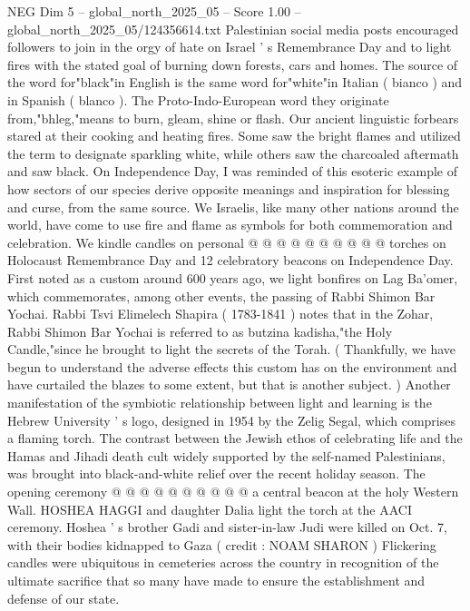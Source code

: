 \begin{textsample}{NEG Dim 5 – global\_north\_2025\_05 – Score 1.00 – global\_north\_2025\_05/124356614.txt}  \label{ex:f5_neg_378}
Palestinian social media posts encouraged followers to join in the orgy of hate on Israel ' s Remembrance Day and to light fires with the stated goal of burning down forests, cars and homes.
The source of the word for"black"in English is the same word for"white"in Italian ( bianco ) and in Spanish ( blanco ).
The Proto-Indo-European word they originate from,"bhleg,"means to burn, gleam, shine or flash.
Our ancient linguistic forbears stared at their cooking and heating fires.
Some saw the bright flames and utilized the term to designate sparkling white, while others saw the charcoaled aftermath and saw black.
On Independence Day, I was reminded of this esoteric example of how sectors of our species derive opposite meanings and inspiration for blessing and curse, from the same source.
We Israelis, like many other nations around the world, have come to use fire and flame as symbols for both commemoration and celebration.
We kindle candles on personal @ @ @ @ @ @ @ @ @ @ torches on Holocaust Remembrance Day and 12 celebratory beacons on Independence Day.
First noted as a custom around 600 years ago, we light bonfires on Lag Ba'omer, which commemorates, among other events, the passing of Rabbi Shimon Bar Yochai.
Rabbi Tsvi Elimelech Shapira ( 1783-1841 ) notes that in the Zohar, Rabbi Shimon Bar Yochai is referred to as butzina kadisha,"the Holy Candle,"since he brought to light the secrets of the Torah. ( Thankfully, we have begun to understand the adverse effects this custom has on the environment and have curtailed the blazes to some extent, but that is another subject. ) Another manifestation of the symbiotic relationship between light and learning is the Hebrew University ' s logo, designed in 1954 by the Zelig Segal, which comprises a flaming torch.
The contrast between the Jewish ethos of celebrating life and the Hamas and Jihadi death cult widely supported by the self-named Palestinians, was brought into black-and-white relief over the recent holiday season.
The opening ceremony @ @ @ @ @ @ @ @ @ @ a central beacon at the holy Western Wall.
HOSHEA HAGGI and daughter Dalia light the torch at the AACI ceremony.
Hoshea ' s brother Gadi and sister-in-law Judi were killed on Oct. 7, with their bodies kidnapped to Gaza ( credit : NOAM SHARON ) Flickering candles were ubiquitous in cemeteries across the country in recognition of the ultimate sacrifice that so many have made to ensure the establishment and defense of our state.

\end{textsample}
